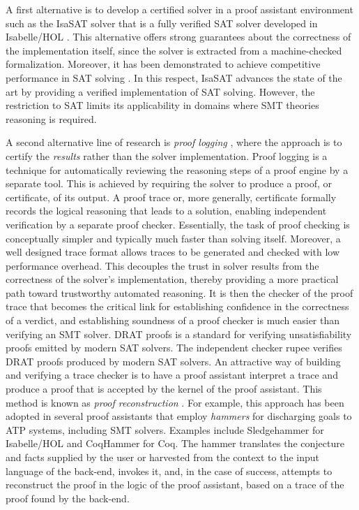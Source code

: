 A first alternative is to develop a certified solver in a proof assistant environment such as the IsaSAT solver \cite{fleury:tel-02963301,fleury:hal-01904647} that is a fully verified \ac{SAT} solver developed in Isabelle/HOL \cite{isabelle-hol-ref}.
This alternative offers strong guarantees about the correctness of the implementation itself, since the solver is extracted from a machine-checked formalization.
Moreover, it has been demonstrated to achieve competitive performance in SAT solving \cite{EDA-challenge}.
In this respect, IsaSAT advances the state of the art by providing a verified implementation of SAT solving.
However, the restriction to SAT limits its applicability in domains where SMT theories reasoning is required.


A second alternative line of research is \emph{proof logging} \cite{proof-logging}, where the approach is to certify the \emph{results} rather than the solver implementation.
Proof logging is a technique for automatically reviewing the reasoning steps of a proof engine by a separate tool.
This is achieved by requiring the solver to produce a proof, or certificate, of its output.
A proof trace or, more generally, certificate formally records the logical reasoning that leads to a solution, enabling independent verification by a separate proof checker.
Essentially, the task of proof checking is conceptually simpler and typically much faster than solving itself.
Moreover, a well designed trace format allows traces to be generated and checked with low performance overhead.
This decouples the trust in solver results from the correctness of the solver’s implementation, thereby providing a more practical path toward trustworthy automated reasoning.
It is then the checker of the proof trace that becomes the critical link for establishing confidence in the correctness of a verdict, and establishing soundness of a proof checker is much easier than verifying an SMT solver.
DRAT proofs \cite{drat} is a standard for verifying unsatisfiability proofs emitted by modern SAT solvers.
The independent checker rupee \cite{drat-checking} verifies DRAT proofs produced by modern SAT solvers.
An attractive way of building and verifying a trace checker is to have a proof assistant interpret a trace and produce a proof that is accepted by the kernel of the proof assistant.
This method is known as \emph{proof reconstruction} \cite{z3recon}.
For example, this approach has been adopted in several proof assistants that employ \emph{hammers} for discharging goals to \ac{ATP} systems, including SMT solvers.
Examples include Sledgehammer \cite{Sledgehammer} for Isabelle/HOL and CoqHammer \cite{coqhammer1,coqhammer2} for Coq.
The hammer translates the conjecture and facts supplied by the user or harvested from the context to the input language of the back-end, invokes it, and, in the case of success, attempts to reconstruct the proof in the logic of the proof assistant, based on a trace of the proof found by the back-end.

